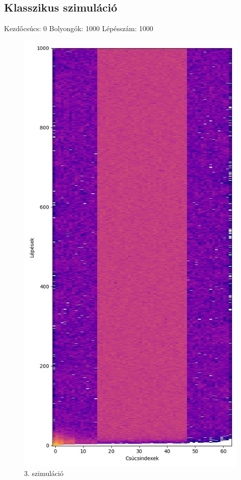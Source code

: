 \documentclass[14pt,a4paper]{article}
\begin{document}
\subsection{Klasszikus szimuláció}
Kezdőcsúcs: 0
Bolyongók: 1000
Lépésszám: 1000
\begin{figure}[H]
\centering
\includegraphics[width = 0.7\columnwidth]{sim03.jpg}
\caption{3. szimuláció}
\end{figure}
\end{document}
